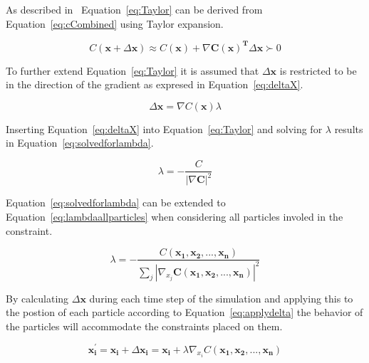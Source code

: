 As described in~\cite{macklin2013position} Equation~\ref{eq:Taylor} can be
derived from Equation~\ref{eq:cCombined} using Taylor expansion.

\begin{equation}
\label{eq:Taylor}
C(\mathbf{x} + \Delta \mathbf{x}) \approx C(\mathbf{x}) + \nabla \mathbf{C(\mathbf{x})^{T}} \Delta \mathbf{x} \succ 0
\end{equation}

To further extend Equation~\ref{eq:Taylor} it is assumed that $ \Delta
\mathbf{x} $ is restricted to be in the direction of the gradient as expresed
in Equation~\ref{eq:deltaX}.

\begin{equation}
\label{eq:deltaX}
\Delta \mathbf{x} = \nabla C(\mathbf{x}) \lambda
\end{equation}

Inserting Equation~\ref{eq:deltaX} into Equation~\ref{eq:Taylor} and solving for $ \lambda $ results in Equation~\ref{eq:solvedforlambda}.

\begin{equation}
\label{eq:solvedforlambda}
\lambda = - \frac{C}{\left | \nabla \mathbf{C} \right |^2}
\end{equation}

Equation~\ref{eq:solvedforlambda} can be extended to
Equation~\ref{eq:lambdaallparticles} when considering all particles involed in
the constraint.

\begin{equation}
\label{eq:lambdaallparticles}
\lambda = - \frac{C(\mathbf{x_{1}}, \mathbf{x_{2}}, ..., \mathbf{x_{n}})}{\sum_{j} \left | \nabla_{x_{j}} \mathbf{C(\mathbf{x_{1}}, \mathbf{x_{2}}, ..., \mathbf{x_{n}})} \right |^2}
\end{equation}

By calculating $ \Delta \mathbf{x} $ during each time step of the simulation
and applying this to the postion of each particle according to
Equation~\ref{eq:applydelta} the behavior of the particles will accommodate the
constraints placed on them.

\begin{equation}
\label{eq:applydelta}
\mathbf{x_{i}^{'}} = \mathbf{x_{i}} + \Delta \mathbf{x_{i}} = \mathbf{x_{i}} + \lambda \nabla_{x_{i}} C(\mathbf{x_{1}}, \mathbf{x_{2}}, ..., \mathbf{x_{n}})
\end{equation}

